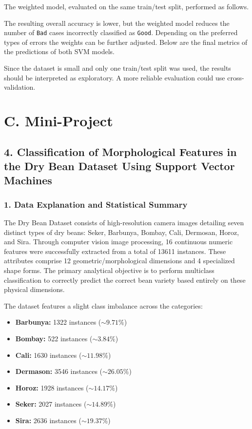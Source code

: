 \documentclass{article}
\begin{document}
The weighted model, evaluated on the same train/test split, performed as follows.



The resulting overall accuracy is lower, but the weighted model reduces the number of \texttt{Bad} cases incorrectly classified as \texttt{Good}. Depending on the preferred types of errors the weights can be further adjusted. Below are the final metrics of the predictions of both SVM models.



Since the dataset is small and only one train/test split was used, the results should be interpreted as exploratory. A more reliable evaluation could use cross-validation.







\newpage

\section*{C. Mini-Project}

\subsection*{4. Classification of Morphological Features in the Dry Bean Dataset Using Support Vector Machines}

\subsubsection*{1. Data Explanation and Statistical Summary}

The Dry Bean Dataset consists of high-resolution camera images detailing seven distinct types of dry beans: Seker, Barbunya, Bombay, Cali, Dermosan, Horoz, and Sira. Through computer vision image processing, 16 continuous numeric features were successfully extracted from a total of 13611 instances. These attributes comprise 12 geometric/morphological dimensions and 4 specialized shape forms. The primary analytical objective is to perform multiclass classification to correctly predict the correct bean variety based entirely on these physical dimensions.

The dataset features a slight class imbalance across the categories:

\begin{itemize}
    \item \textbf{Barbunya:} 1322 instances ($\sim 9.71\%$)
    \item \textbf{Bombay:} 522 instances ($\sim 3.84\%$)
    \item \textbf{Cali:} 1630 instances ($\sim 11.98\%$)
    \item \textbf{Dermason:} 3546 instances ($\sim 26.05\%$)
    \item \textbf{Horoz:} 1928 instances ($\sim 14.17\%$)
    \item \textbf{Seker:} 2027 instances ($\sim 14.89\%$)
    \item \textbf{Sira:} 2636 instances ($\sim 19.37\%$)
\end{itemize}
\end{document}
